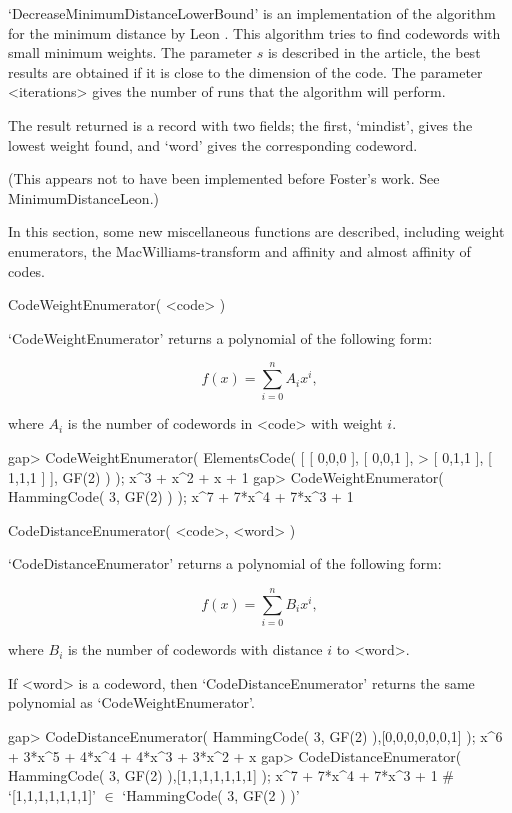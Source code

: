 `DecreaseMinimumDistanceLowerBound' is an implementation of the algorithm
for the minimum distance by Leon \cite{Leon88}. This algorithm  tries  to
find codewords with small minimum weights. The parameter $s$ is described
in the article, the best results are obtained  if  it  is  close  to  the
dimension of the code. The parameter <iterations>  gives  the  number  of
runs that the algorithm will perform.

The result returned is a record with two fields;  the  first,  `mindist',
gives the  lowest  weight  found,  and  `word'  gives  the  corresponding
codeword.

(This appears not to have been implemented before Foster's work.
See MinimumDistanceLeon.)


In  this  section,  some  new  miscellaneous  functions  are   described,
including weight enumerators, the MacWilliams-transform and affinity  and
almost affinity of codes.

\>CodeWeightEnumerator( <code> )

`CodeWeightEnumerator' returns a polynomial of the following form:

$$
f(x) = \sum_{i=0}^{n} A_i x^i,
$$

where $A_i$ is the number of codewords in <code> with weight $i$.

\beginexample
gap> CodeWeightEnumerator( ElementsCode( [ [ 0,0,0 ], [ 0,0,1 ],
> [ 0,1,1 ], [ 1,1,1 ] ], GF(2) ) );
x^3 + x^2 + x + 1
gap> CodeWeightEnumerator( HammingCode( 3, GF(2) ) );
x^7 + 7*x^4 + 7*x^3 + 1 
\endexample

\>CodeDistanceEnumerator( <code>, <word> )

`CodeDistanceEnumerator' returns a polynomial of the following form:

$$
f(x) = \sum_{i=0}^{n} B_i x^i,
$$

where $B_i$ is the number of codewords with distance $i$ to <word>.

If <word> is a codeword, then `CodeDistanceEnumerator' returns the
same polynomial as `CodeWeightEnumerator'.

\beginexample
gap> CodeDistanceEnumerator( HammingCode( 3, GF(2) ),[0,0,0,0,0,0,1] );
x^6 + 3*x^5 + 4*x^4 + 4*x^3 + 3*x^2 + x
gap> CodeDistanceEnumerator( HammingCode( 3, GF(2) ),[1,1,1,1,1,1,1] );
x^7 + 7*x^4 + 7*x^3 + 1 # `[1,1,1,1,1,1,1]' $\in$ `HammingCode( 3, GF(2 ) )'
\endexample

